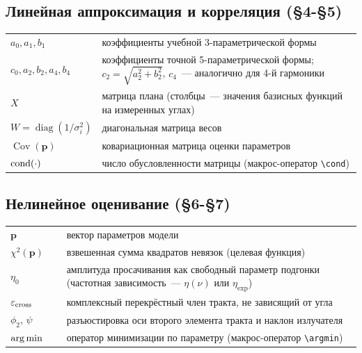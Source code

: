 \subsection*{Линейная аппроксимация и корреляция (§4-§5)}
\begin{center}
\footnotesize
\setlength{\tabcolsep}{6pt}
\begin{tabular}{@{}p{0.16\linewidth}p{0.84\linewidth}@{}}
\toprule
$a_0,a_1,b_1$ & коэффициенты учебной 3-параметрической формы \\
$c_0,a_2,b_2,a_4,b_4$ & коэффициенты точной 5-параметрической формы; $c_2=\sqrt{a_2^2+b_2^2}$,
$c_4$~--- аналогично для 4-й гармоники \\
$X$ & матрица плана (столбцы~--- значения базисных функций на измеренных углах) \\
$W=\operatorname{diag}(1/\sigma_i^2)$ & диагональная матрица весов \\
$\operatorname{Cov}(\mathbf{p})$ & ковариационная матрица оценки параметров \\
$\operatorname{cond}(\cdot)$ & число обусловленности матрицы (макрос-оператор \texttt{\textbackslash cond}) \\
\bottomrule
\end{tabular}
\end{center}

\subsection*{Нелинейное оценивание (§6-§7)}
\begin{center}
\footnotesize
\setlength{\tabcolsep}{6pt}
\begin{tabular}{@{}p{0.16\linewidth}p{0.84\linewidth}@{}}
\toprule
$\mathbf{p}$ & вектор параметров модели \\
$\chi^2(\mathbf{p})$ & взвешенная сумма квадратов невязок (целевая функция) \\
$\eta_0$ & амплитуда просачивания как свободный параметр подгонки (частотная зависимость~---
$\eta(\nu)$ или $\eta_{\exp}$) \\
$\varepsilon_{\rm cross}$ & комплексный перекрёстный член тракта, не зависящий от угла \\
$\phi_2$, $\psi$ & разъюстировка оси второго элемента тракта и наклон излучателя \\
$\operatorname*{arg\,min}$ & оператор минимизации по параметру (макрос-оператор \texttt{\textbackslash argmin}) \\
\bottomrule
\end{tabular}
\end{center}

